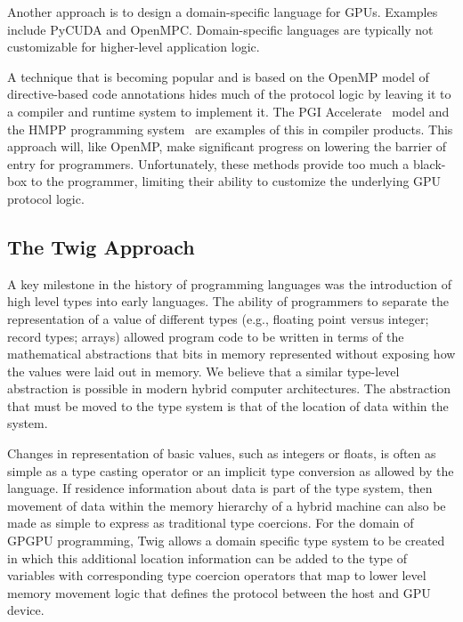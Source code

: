 Another approach is to design a domain-specific language for GPUs. Examples
include PyCUDA and OpenMPC. Domain-specific languages are typically not
customizable for higher-level application logic.

A technique that is becoming popular and is based on the OpenMP model
of directive-based code annotations hides much of the protocol logic
by leaving it to a compiler and runtime system to implement it.  The
PGI Accelerate~\cite{pgi-accelerate} model and the HMPP programming
system~\cite{hmpp} are examples of this in compiler products.  This
approach will, like OpenMP, make significant progress on lowering the
barrier of entry for programmers.  Unfortunately, these methods
provide too much a black-box to the programmer, limiting their ability
to customize the underlying GPU protocol logic.

\subsection{The Twig Approach}


A key milestone in the history of programming languages was the introduction
of high level types into early languages. The ability of programmers to
separate the representation of a value of different types (e.g., floating
point versus integer; record types; arrays) allowed program code to be written
in terms of the mathematical abstractions that bits in memory represented
without exposing how the values were laid out in memory. We believe that a
similar type-level abstraction is possible in modern hybrid computer
architectures. The abstraction that must be moved to the type system is that
of the location of data within the system.

Changes in representation of basic values, such as integers or floats, is
often as simple as a type casting operator or an implicit type conversion as
allowed by the language. If residence information about data is part of the
type system, then movement of data within the memory hierarchy of a hybrid
machine can also be made as simple to express as traditional type coercions.
For the domain of GPGPU programming, Twig allows a domain specific type system
to be created in which this additional location information can be added to
the type of variables with corresponding type coercion operators that map to
lower level memory movement logic that defines the protocol between the host
and GPU device.

